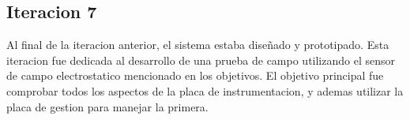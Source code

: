 \subsection{Iteracion 7} %
\label{sub:iteracion_7}

Al final de la iteracion anterior, el sistema estaba diseñado y prototipado. Esta iteracion fue dedicada al desarrollo de una prueba de campo utilizando el sensor de campo electrostatico mencionado en los objetivos. El objetivo principal fue comprobar todos los aspectos de la placa de instrumentacion, y ademas utilizar la placa de gestion para manejar la primera.











